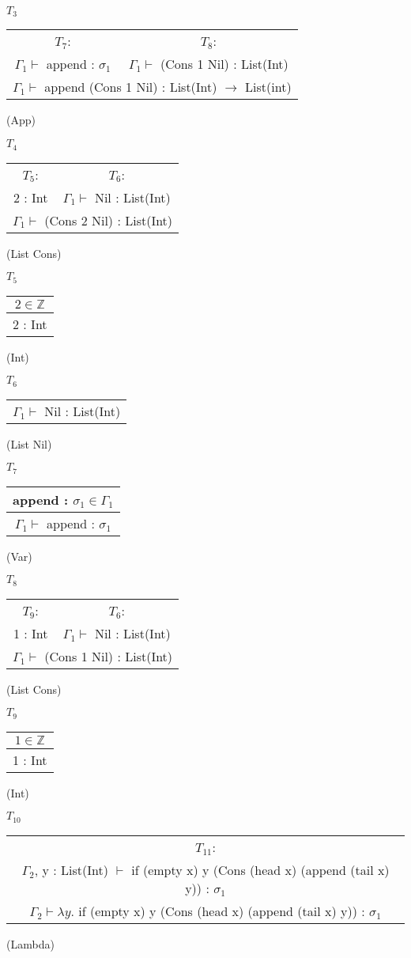 \documentclass[12pt, a4paper]{article}
\begin{document}
\begin{enumerate}[(a)]
	$T_3$
	\begin{tabular}{c c}
		$T_7$: & $T_8$:\\
		$\Gamma_1 \vdash$ append : $\sigma_1$ & $\Gamma_1 \vdash$ (Cons 1 Nil) : List(Int)
		\\\hline
		\multicolumn{2}{c}{$\Gamma_1 \vdash$ append (Cons 1 Nil) : List(Int) $\rightarrow$ List(int)}
	\end{tabular}
	(App)

	$T_4$
	\begin{tabular}{c c}
		$T_5$: & $T_6$:\\
		2 : Int & $\Gamma_1 \vdash$ Nil : List(Int)
		\\\hline
		\multicolumn{2}{c}{$\Gamma_1 \vdash$ (Cons 2 Nil) : List(Int)}
	\end{tabular}
	(List Cons)

	$T_5$
	\begin{tabular}{c}
		$2 \in \mathbb{Z}$
		\\\hline
		2 : Int
	\end{tabular}
	(Int)

	$T_6$
	\begin{tabular}{c}
		\\\hline
		$\Gamma_1 \vdash$ Nil : List(Int)
	\end{tabular}
	(List Nil)

	$T_7$
	\begin{tabular}{c}
		append : $\sigma_1 \in \Gamma_1$
		\\\hline
		$\Gamma_1 \vdash$ append : $\sigma_1$
	\end{tabular}
	(Var)

	$T_8$
	\begin{tabular}{c c}
		$T_9$: &$T_6$:\\
		1 : Int & $\Gamma_1 \vdash$ Nil : List(Int)
		\\\hline
		\multicolumn{2}{c}{$\Gamma_1 \vdash$ (Cons 1 Nil) : List(Int)}
	\end{tabular}
	(List Cons)

	$T_9$
	\begin{tabular}{c}
		$1 \in \mathbb{Z}$
		\\\hline
		1 : Int
	\end{tabular}
	(Int)

	$T_{10}$
	\begin{tabular}{c}
		$T_{11}$:\\
		$\Gamma_2$, y : List(Int) $\vdash$ if (empty x) y (Cons (head x) (append (tail x) y)) : $\sigma_1$
		\\\hline
		$\Gamma_2 \vdash \lambda y.$ if (empty x) y (Cons (head x) (append (tail x) y)) : $\sigma_1$
	\end{tabular}
	(Lambda)


\end{enumerate}
\end{document}
